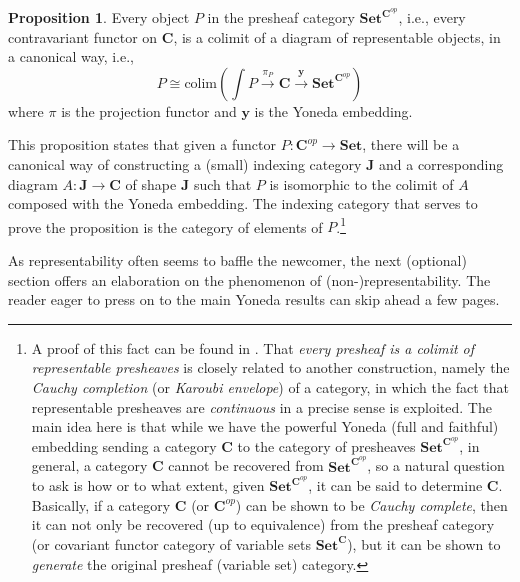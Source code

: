 \documentclass[a4paper]{book}
\theoremstyle{definition}
\theoremstyle{definition}
\theoremstyle{definition}
\newtheorem{proposition}{Proposition}[section]
\theoremstyle{theorem}
\theoremstyle{definition}
\begin{document}
\begin{proposition}
	Every object $P$ in the presheaf category  $\textbf{Set}^{\textbf{C}^{op}}$, i.e., every contravariant functor on $\textbf{C}$, is a colimit of a diagram of representable objects, in a canonical way, i.e., 
	\begin{equation*}
	P \cong \text{colim}(\int P \xrightarrow{\pi_P} \textbf{C} \xrightarrow{\textbf{y}} \textbf{Set}^{\textbf{C}^{op}})
	\end{equation*} 
	where $\pi$ is the projection functor and $\textbf{y}$ is the Yoneda embedding.  
\end{proposition} 
This proposition states that given a functor $P: \textbf{C}^{op} \rightarrow \textbf{Set}$, there will be a canonical way of constructing a (small) indexing category $\textbf{J}$ and a corresponding diagram $A: \textbf{J} \rightarrow \textbf{C}$ of shape $\textbf{J}$ such that $P$ is isomorphic to the colimit of $A$ composed with the Yoneda embedding. The indexing category that serves to prove the proposition is the category of elements of $P$.\footnote{A proof of this fact can be found in \cite{riehl_category_2016}. That \textit{every presheaf is a colimit of representable presheaves} is closely related to another construction, namely the \textit{Cauchy completion} (or \textit{Karoubi envelope}) of a category, in which the fact that representable presheaves are \textit{continuous} in a precise sense is exploited. The main idea here is that while we have the powerful Yoneda (full and faithful) embedding sending a category \textbf{C} to the category of presheaves $\textbf{Set}^{\textbf{C}^{op}}$, in general, a category \textbf{C} cannot be recovered from $\textbf{Set}^{\textbf{C}^{op}}$, so a natural question to ask is how or to what extent, given $\textbf{Set}^{\textbf{C}^{op}}$, it can be said to determine \textbf{C}. Basically, if a category \textbf{C} (or $\textbf{C}^{op}$) can be shown to be \textit{Cauchy complete}, then it can not only be recovered (up to equivalence) from the presheaf category (or covariant functor category of variable sets $\textbf{Set}^{\textbf{C}}$), but it can be shown to \textit{generate} the original presheaf (variable set) category.} \par 
As representability often seems to baffle the newcomer, the next (optional) section offers an elaboration on the phenomenon of (non-)representability. The reader eager to press on to the main Yoneda results can skip ahead a few pages.  
\end{document}
